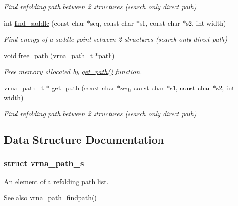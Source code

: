 \begin{DoxyCompactItemize}
\begin{DoxyCompactList}\small\item\em Find refolding path between 2 structures (search only direct path) \end{DoxyCompactList}\item 
int \mbox{\hyperlink{group__direct__paths_ga4c0dabf032c04eeab9c7370d15db6ad2}{find\+\_\+saddle}} (const char $\ast$seq, const char $\ast$s1, const char $\ast$s2, int width)
\begin{DoxyCompactList}\small\item\em Find energy of a saddle point between 2 structures (search only direct path) \end{DoxyCompactList}\item 
void \mbox{\hyperlink{group__direct__paths_ga9056421d716ae89f0ed3f107627f395b}{free\+\_\+path}} (\mbox{\hyperlink{group__direct__paths_ga818d4f3d1cf8723d6905990b08d909fe}{vrna\+\_\+path\+\_\+t}} $\ast$path)
\begin{DoxyCompactList}\small\item\em Free memory allocated by \mbox{\hyperlink{group__direct__paths_gac009a44db824f90a6de5f9c28b9b3222}{get\+\_\+path()}} function. \end{DoxyCompactList}\item 
\mbox{\hyperlink{group__direct__paths_ga818d4f3d1cf8723d6905990b08d909fe}{vrna\+\_\+path\+\_\+t}} $\ast$ \mbox{\hyperlink{group__direct__paths_gac009a44db824f90a6de5f9c28b9b3222}{get\+\_\+path}} (const char $\ast$seq, const char $\ast$s1, const char $\ast$s2, int width)
\begin{DoxyCompactList}\small\item\em Find refolding path between 2 structures (search only direct path) \end{DoxyCompactList}\end{DoxyCompactItemize}


\subsection{Data Structure Documentation}
\label{structvrna__path__s}
\subsubsection{struct vrna\+\_\+path\+\_\+s}
An element of a refolding path list. 

\begin{DoxySeeAlso}{See also}
\mbox{\hyperlink{group__direct__paths_ga4b2283c4142cafd99678495585fcc842}{vrna\+\_\+path\+\_\+findpath()}} 
\end{DoxySeeAlso}
